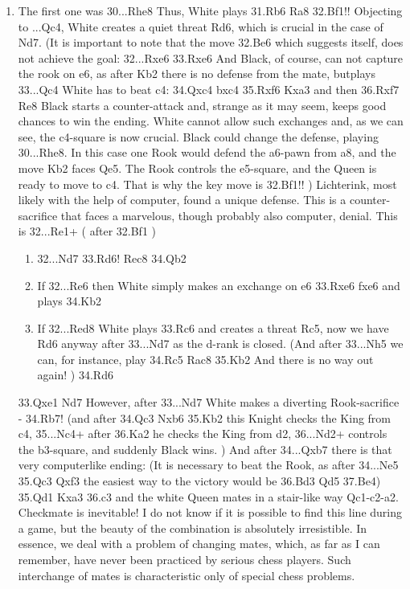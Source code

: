 \documentclass[
	11pt,twocolumn]{article}
\begin{document}
\begin{enumerate}
\item
The first one was 30...Rhe8  Thus, White plays 31.Rb6 Ra8 32.Bf1!!  Objecting to ...Qc4, White creates a quiet threat Rd6, which is crucial in the case of Nd7. (It is important to note that the move 32.Be6  which suggests itself, does not achieve the goal: 32...Rxe6 33.Rxe6  And Black, of course, can not capture the rook on e6, as after Kb2 there is no defense from the mate, butplays 33...Qc4  White has to beat c4: 34.Qxc4 bxc4 35.Rxf6 Kxa3  and then 36.Rxf7 Re8 Black starts a counter-attack and, strange as it may seem, keeps good chances to win the ending. White cannot allow such exchanges and, as we can see, the c4-square is now crucial. Black could change the defense, playing 30...Rhe8. In this case one Rook would defend the a6-pawn from a8, and the move Kb2 faces Qe5. The Rook controls the e5-square, and the Queen is ready to move to c4. That is why the key move is 32.Bf1!! ) Lichterink, most likely with the help of computer, found a unique defense. This is a counter-sacrifice that faces a marvelous, though probably also computer, denial. This is 32...Re1+  ( after 32.Bf1 ) 

\begin{enumerate}
\item
32...Nd7 33.Rd6! Rec8 34.Qb2

\item
If 32...Re6  then White simply makes an exchange on e6 33.Rxe6 fxe6  and plays 34.Kb2

\item
If 32...Red8  White plays 33.Rc6  and creates a threat Rc5, now we have Rd6 anyway after 33...Nd7  as the d-rank is closed. (And after 33...Nh5  we can, for instance, play 34.Rc5 Rac8 35.Kb2 And there is no way out again! ) 34.Rd6  
\end{enumerate}

33.Qxe1 Nd7  However, after 33...Nd7 White makes a diverting Rook-sacrifice - 34.Rb7! (and after 34.Qc3 Nxb6 35.Kb2  this Knight checks the King from c4, 35...Nc4+  after 36.Ka2  he checks the King from d2, 36...Nd2+ controls the b3-square, and suddenly Black wins. ) And after 34...Qxb7  there is that very computerlike ending: (It is necessary to beat the Rook, as after 34...Ne5 35.Qc3 Qxf3  the easiest way to the victory would be 36.Bd3 Qd5 37.Be4) 35.Qd1 Kxa3 36.c3 and the white Queen mates in a stair-like way Qc1-c2-a2. Checkmate is inevitable! I do not know if it is possible to find this line during a game, but the beauty of the combination is absolutely irresistible. In essence, we deal with a problem of changing mates, which, as far as I can remember, have never been practiced by serious chess players. Such interchange of mates is characteristic only of special chess problems. 


\end{enumerate}
\end{document}
